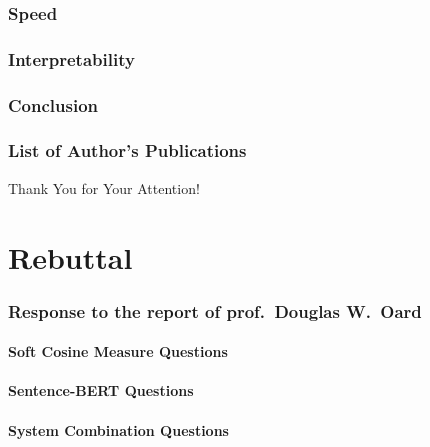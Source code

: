 \section{Speed}
\section{Interpretability}
\section{Conclusion}
\section{List of Author's Publications}

\begin{frame}[plain]
\vfill
\centerline{Thank You for Your Attention!}
\vfill\vfill
\end{frame}

\part{Rebuttal}
\frame{\vfill\partpage\vfill}

\section{Response to the report of prof.\ Douglas W.\ Oard}

\subsection{Soft Cosine Measure Questions}
\begin{frame}{\secname}
\end{frame}

\subsection{Sentence-BERT Questions}
\begin{frame}{\secname}
\end{frame}

\subsection{System Combination Questions}
\begin{frame}[fragile]{\secname}
\end{frame}

